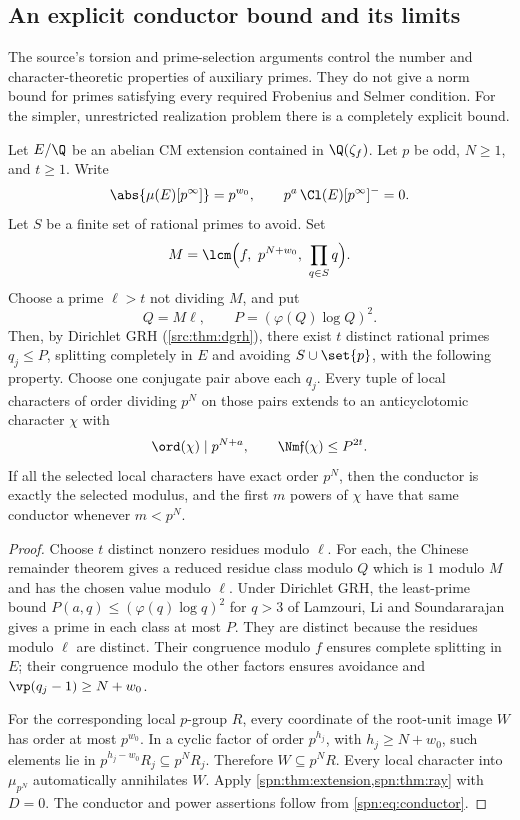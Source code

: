 \subsection{An explicit conductor bound and its limits}\label{spn:sec:conductor}

The source's torsion and prime-selection arguments control the number and
character-theoretic properties of auxiliary primes. They do not give a norm
bound for primes satisfying every required Frobenius and Selmer condition.
For the simpler, unrestricted realization problem there is a completely
explicit bound.

\begin{theorem}\label{spn:thm:bounded-conductor}
Let $E/\Q$ be an abelian CM extension contained in $\Q(\zeta_f)$. Let $p$ be
odd, $N\ge1$, and $t\ge1$. Write
\[
 \abs{\mu(E)[p^\infty]}=p^{w_0},\qquad p^a\,\Cl(E)[p^\infty]^{-}=0 .
\]
Let $S$ be a finite set of rational primes to avoid. Set
\[
 M=\lcm\Bigl(f,\ p^{N+w_0},\ \prod_{q\in S}q\Bigr).
\]
Choose a prime $\ell>t$ not dividing $M$, and put
\[
 Q=M\ell,\qquad P=(\varphi(Q)\log Q)^2 .
\]
Then, by Dirichlet GRH (\cref{src:thm:dgrh}), there exist $t$ distinct
rational primes $q_j\le P$, splitting completely in $E$ and avoiding $S\cup\set{p}$, with the following property.
Choose one conjugate pair above each $q_j$. Every tuple of local characters
of order dividing $p^N$ on those pairs extends to an anticyclotomic character
$\chi$ with
\[
 \ord(\chi)\mid p^{N+a},\qquad\Nm\mathfrak f(\chi)\le P^{2t}.
\]
If all the selected local characters have exact order $p^N$, then the
conductor is exactly the selected modulus, and the first $m$ powers of $\chi$
have that same conductor whenever $m<p^N$.
\end{theorem}

\begin{proof}
Choose $t$ distinct nonzero residues modulo $\ell$. For each, the Chinese
remainder theorem gives a reduced residue class modulo $Q$ which is $1$
modulo $M$ and has the chosen value modulo $\ell$. Under Dirichlet GRH, the
least-prime bound $P(a,q)\le(\varphi(q)\log q)^2$ for $q>3$ of Lamzouri, Li
and Soundararajan \cite[Corollary~1.2]{LamzouriLiSoundararajan2015Conditional} gives a prime
in each class at most $P$. They are distinct because the residues modulo $\ell$ are distinct.
Their congruence modulo $f$ ensures complete splitting in $E$; their
congruence modulo the other factors ensures avoidance and
$\vp(q_j-1)\ge N+w_0$.

For the corresponding local $p$-group $R$, every coordinate of the root-unit
image $W$ has order at most $p^{w_0}$. In a cyclic factor of order
$p^{h_j}$, with $h_j\ge N+w_0$, such elements lie in
$p^{h_j-w_0}R_j\subseteq p^NR_j$. Therefore $W\subseteq p^NR$. Every local
character into $\mu_{p^N}$ automatically annihilates $W$. Apply
\cref{spn:thm:extension,spn:thm:ray} with $D=0$. The conductor and power
assertions follow from \eqref{spn:eq:conductor}.
\end{proof}

